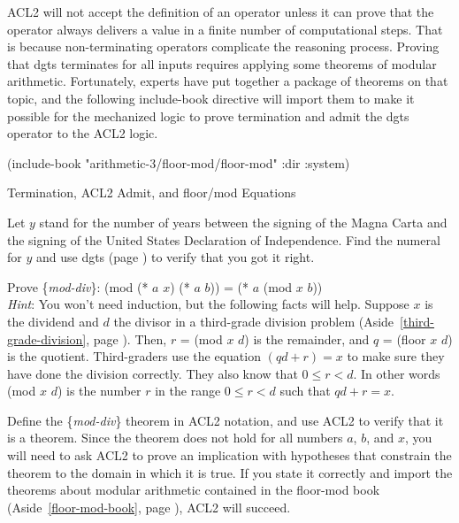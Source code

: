 \begin{aside}
ACL2 will not accept the definition of
an operator unless
it can prove that the operator always delivers a value in
a finite number of computational steps.
That is because non-terminating operators complicate the reasoning process.
Proving that dgts terminates for all inputs
requires applying some theorems of modular arithmetic.
Fortunately, experts have put together a package of theorems on that topic,
and the following include-book directive will import them 
to make it possible for the mechanized logic to prove termination
and admit the dgts operator to the ACL2 logic.
\vspace{2mm}
\begin{center}
(include-book "arithmetic-3/floor-mod/floor-mod" :dir :system)
\end{center}
\caption{Termination, ACL2 Admit, and floor/mod Equations}
\label{admit-def}
\label{floor-mod-book}
\label{floor-mod-include-book}
\end{aside}

\begin{ExerciseList}
\Exercise Let $y$ stand for the number of years
between the signing of the Magna Carta and
the signing of the United States Declaration of Independence.
Find the numeral for $y$ and use dgts (page \pageref{dgts-defun})
to verify that you got it right.

\Exercise \label{modular-division}
Prove \{\emph{mod-div}\}:
(mod (* $a$ $x$) (* $a$ $b$)) = (* $a$ (mod $x$ $b$)) \\
\emph{Hint}: You won't need induction, but the following facts will help.
Suppose $x$ is the dividend and $d$ the divisor
in a third-grade division problem 
(Aside~\ref{third-grade-division}, page \pageref{third-grade-division}).
Then, $r$ = (mod $x$ $d$) is the remainder,
and $q$ = (floor $x$ $d$) is the quotient.
Third-graders use the equation $(qd + r) = x$ 
to make sure they have done the division correctly.
They also know that $0 \le r < d$. 
In other words (mod $x$ $d$) is the number $r$
in the range $0 \le r < d$ such that $qd + r = x$.

\Exercise \label{mod-div-defthm}Define  
the \{\emph{mod-div}\} theorem
in ACL2 notation, and use ACL2 to verify that it is a theorem.
Since the theorem does not hold for all numbers $a$, $b$, and $x$,
you will need to ask ACL2 to prove an implication with
hypotheses that constrain the theorem to the domain in which it is true. 
If you state it correctly and import the
theorems about modular arithmetic contained in the floor-mod book
(Aside~\ref{floor-mod-book}, page \pageref{floor-mod-book}),
ACL2 will succeed.
\end{ExerciseList}

